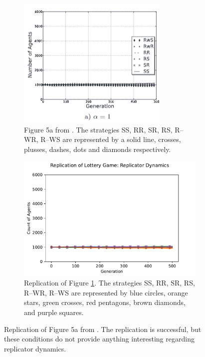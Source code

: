 \FloatBarrier 
\begin{figure}[!h]
  \begin{subfigure}[b]{0.45\textwidth}
    \includegraphics[width=\textwidth]{images/lottery1.png}
    \caption{Figure 5a from \cite{RN30}. The strategies SS, RR, SR, RS, R--WR, R--WS are represented by a solid line, crosses, plusses, dashes, dots and diamonds respectively. }
    \label{lottery1}
  \end{subfigure}
  \hfill
  \begin{subfigure}[b]{0.45\textwidth}
    \includegraphics[width=1.25\textwidth]{images/lottery1_me.pdf}
    \caption{Replication of Figure \ref{lottery1}. The strategies SS, RR, SR, RS, R--WR, R--WS are represented by blue circles, orange stars, green crosses, red pentagons, brown diamonds, and purple squares.}
    \label{lottery1_me}
  \end{subfigure}
  \caption{Replication of Figure 5a from \cite{RN30}. The replication is successful, but these conditions do not provide anything interesting regarding replicator dynamics.  } \label{lottery_comp0}
\end{figure} 
